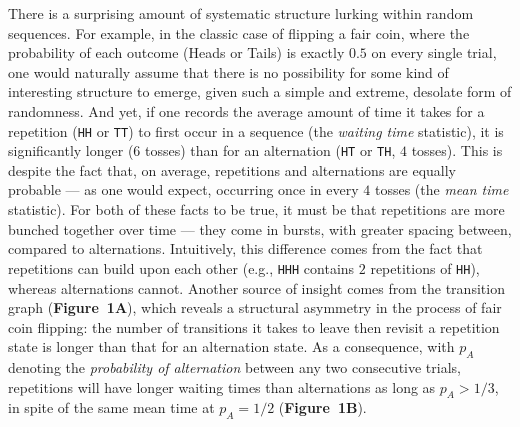 \documentclass[11pt]{article}
\begin{document}
There is a surprising amount of systematic structure lurking within random sequences.
For example, in the classic case of flipping a fair coin, where the probability of each outcome (Heads or Tails) is exactly $0.5$ on every single trial, one would naturally assume that there is no possibility for some kind of interesting structure to emerge, given such a simple and extreme, desolate form of randomness.
And yet, if one records the average amount of time it takes for a repetition (\texttt{HH} or \texttt{TT}) to first occur in a sequence (the \emph{waiting time} statistic), it is significantly longer ($6$ tosses) than for an alternation (\texttt{HT} or \texttt{TH}, $4$ tosses).
This is despite the fact that, on average, repetitions and alternations are equally probable --- as one would expect, occurring once in every $4$ tosses (the \emph{mean time} statistic).
For both of these facts to be true, it must be that repetitions are more bunched together over time --- they come in bursts, with greater spacing between, compared to alternations.
Intuitively, this difference comes from the fact that repetitions can build upon each other (e.g., \texttt{HHH} contains $2$ repetitions of \texttt{HH}), whereas alternations cannot.
Another source of insight comes from the transition graph (\textbf{Figure~1A}), which reveals a structural asymmetry in the process of fair coin flipping:
the number of transitions it takes to leave then revisit a repetition state is longer than that for an alternation state.
As a consequence, with $p_A$ denoting the \emph{probability of alternation} between any two consecutive trials,
repetitions will have longer waiting times than alternations as long as $p_A > 1/3$, in spite of the same mean time at $p_A = 1/2$ (\textbf{Figure~1B}).
\end{document}
